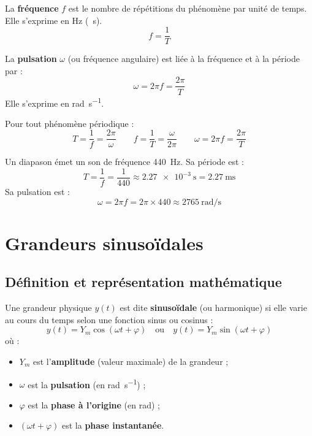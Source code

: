 \begin{definition}[Fréquence $f$]
La \textbf{fréquence} $f$ est le nombre de répétitions du phénomène par unité de temps. Elle s'exprime en \si{\hertz} (\si{\per\second}).
\[
f = \frac{1}{T}
\]
\end{definition}

\begin{definition}
La \textbf{pulsation} $\omega$ (ou fréquence angulaire) est liée à la fréquence et à la période par :
\[
\omega = 2\pi f = \frac{2\pi}{T}
\]
Elle s'exprime en \si{\radian\per\second}.
\end{definition}

\begin{aretenir}
Pour tout phénomène périodique :
\[
\boxed{T = \frac{1}{f} = \frac{2\pi}{\omega}} \qquad \boxed{f = \frac{1}{T} = \frac{\omega}{2\pi}} \qquad \boxed{\omega = 2\pi f = \frac{2\pi}{T}}
\]
\end{aretenir}

\begin{exemple}
Un diapason émet un son de fréquence \SI{440}{\hertz}. Sa période est :
\[
T = \frac{1}{f} = \frac{1}{440} \approx \SI{2.27e-3}{\second} = \SI{2.27}{\milli\second}
\]
Sa pulsation est :
\[
\omega = 2\pi f = 2\pi \times 440 \approx \SI{2765}{\radian\per\second}
\]
\end{exemple}

\section{Grandeurs sinusoïdales}

\subsection{Définition et représentation mathématique}

\begin{definition}
Une grandeur physique $y(t)$ est dite \textbf{sinusoïdale} (ou harmonique) si elle varie au cours du temps selon une fonction sinus ou cosinus :
\[
y(t) = Y_m \cos(\omega t + \varphi) \quad \text{ou} \quad y(t) = Y_m \sin(\omega t + \varphi)
\]
où :
\begin{itemize}
\item $Y_m$ est l'\textbf{amplitude} (valeur maximale) de la grandeur ;
\item $\omega$ est la \textbf{pulsation} (en \si{\radian\per\second}) ;
\item $\varphi$ est la \textbf{phase à l'origine} (en \si{\radian}) ;
\item $(\omega t + \varphi)$ est la \textbf{phase instantanée}.
\end{itemize}
\end{definition}

